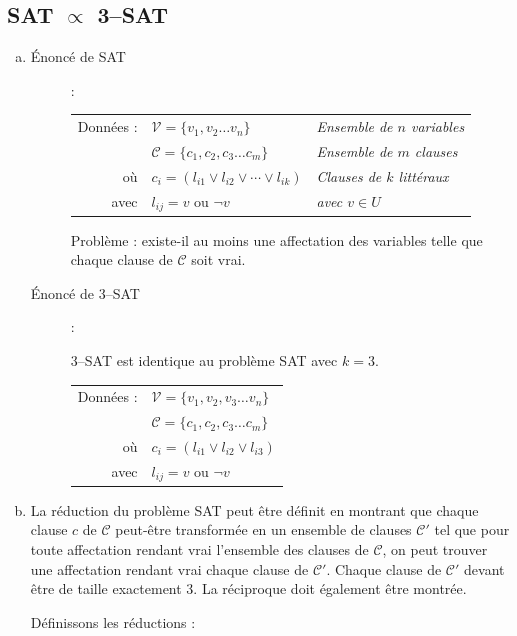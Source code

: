 \subsection{SAT $\propto$ 3--SAT}
\begin{enumerate}[(a)]
\item \begin{description}
\item[Énoncé de SAT] : \\
\begin{tabular}{r l l}
Données : & $ \mathcal{V} = \lbrace v_1, v_2 \ldots v_n \rbrace $ & \emph{Ensemble de $n$ variables}\\
& $ \mathcal{C} = \lbrace c_1, c_2, c_3 \ldots c_m \rbrace $ & \emph{Ensemble de $m$ clauses}\\
où & $ c_i = ( l_{i1} \vee l_{i2} \vee \cdots \vee l_{ik} ) $ & \emph{Clauses de $k$ littéraux}\\
avec & $ l_{ij} = v$ ou $ \neg v $ & \emph{avec $v \in U$} \\
\end{tabular}

Problème : existe-il au moins une affectation des variables telle que chaque clause de $\mathcal{C}$ soit vrai.

\item [Énoncé de 3--SAT] : 

3--SAT est identique au problème SAT avec $k = 3$.\\
\begin{tabular}{r l}
Données : & $ \mathcal{V} = \lbrace v_1, v_2, v_3 \ldots v_n \rbrace $\\
& $ \mathcal{C} = \lbrace c_1, c_2, c_3 \ldots c_m \rbrace $\\
où & $ c_i = ( l_{i1} \vee l_{i2} \vee l_{i3} ) $\\
avec & $ l_{ij} = v$ ou $ \neg v$\\
\end{tabular}
\end{description}
\item La réduction du problème SAT peut être définit en montrant que chaque clause $c$ de $\mathcal{C}$ peut-être transformée en un ensemble de clauses $\mathcal{C'}$ tel que pour toute affectation rendant vrai l'ensemble des clauses de $\mathcal{C}$, on peut trouver une affectation rendant vrai chaque clause de $\mathcal{C'}$. Chaque clause de $\mathcal{C'}$ devant être de taille exactement 3. La réciproque doit également être montrée.

Définissons les réductions :


\end{enumerate}
